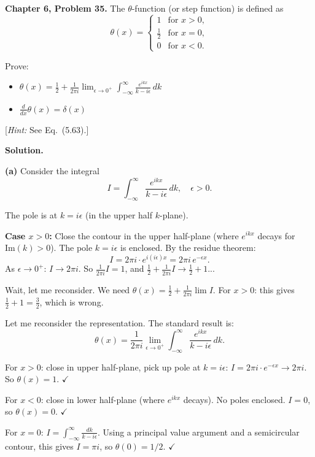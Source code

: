 \documentclass[12pt]{article}
\begin{document}
\textbf{Chapter 6, Problem 35.} The $\theta$-function (or step function) is defined as
\[
\theta(x) = \begin{cases} 1 & \text{for } x > 0, \\ \frac{1}{2} & \text{for } x = 0, \\ 0 & \text{for } x < 0. \end{cases}
\]

Prove:
\begin{itemize}
\item[(a)] $\theta(x) = \frac{1}{2} + \frac{1}{2\pi i}\lim_{\epsilon\to 0^+}\int_{-\infty}^{\infty}\frac{e^{ikx}}{k-i\epsilon}\,dk$
\item[(b)] $\frac{d}{dx}\theta(x) = \delta(x)$
\end{itemize}

[\textit{Hint:} See Eq.\ (5.63).]

\bigskip
\textbf{Solution.}

\textbf{(a)} Consider the integral
\[
I = \int_{-\infty}^{\infty}\frac{e^{ikx}}{k - i\epsilon}\,dk, \quad \epsilon > 0.
\]

The pole is at $k = i\epsilon$ (in the upper half $k$-plane).

\textbf{Case $x > 0$:} Close the contour in the upper half-plane (where $e^{ikx}$ decays for $\text{Im}(k) > 0$). The pole $k = i\epsilon$ is enclosed. By the residue theorem:
\[
I = 2\pi i \cdot e^{i(i\epsilon)x} = 2\pi i\,e^{-\epsilon x}.
\]
As $\epsilon \to 0^+$: $I \to 2\pi i$. So $\frac{1}{2\pi i}I = 1$, and $\frac{1}{2}+\frac{1}{2\pi i}I \to \frac{1}{2}+1$...

Wait, let me reconsider. We need $\theta(x) = \frac{1}{2} + \frac{1}{2\pi i}\lim I$. For $x > 0$: this gives $\frac{1}{2} + 1 = \frac{3}{2}$, which is wrong.

Let me reconsider the representation. The standard result is:
\[
\theta(x) = \frac{1}{2\pi i}\lim_{\epsilon\to 0^+}\int_{-\infty}^{\infty}\frac{e^{ikx}}{k - i\epsilon}\,dk.
\]

For $x > 0$: close in upper half-plane, pick up pole at $k = i\epsilon$: $I = 2\pi i \cdot e^{-\epsilon x} \to 2\pi i$. So $\theta(x) = 1$. $\checkmark$

For $x < 0$: close in lower half-plane (where $e^{ikx}$ decays). No poles enclosed. $I = 0$, so $\theta(x) = 0$. $\checkmark$

For $x = 0$: $I = \int_{-\infty}^{\infty}\frac{dk}{k-i\epsilon}$. Using a principal value argument and a semicircular contour, this gives $I = \pi i$, so $\theta(0) = 1/2$. $\checkmark$
\end{document}
